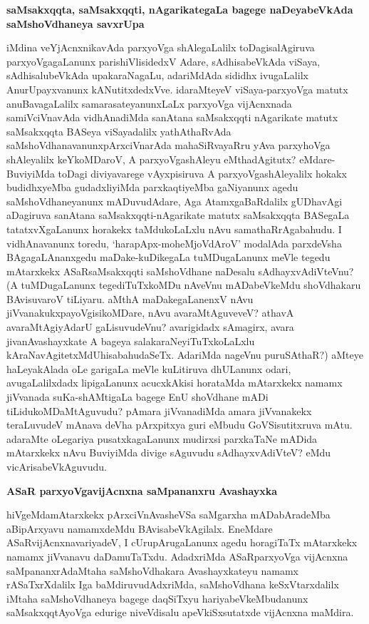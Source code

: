 \textbf{saMsakxqqta, saMsakxqqti, nAgarikategaLa bagege naDeyabeVkAda saMshoVdhaneya savxrUpa}

iMdina veYjAcnxnikavAda parxyoVga shAlegaLalilx toDagisalAgiruva parxyoVgagaLanunx parishiVlisidedxV Adare, sAdhisabeVkAda viSaya, sAdhisalubeVkAda upakaraNagaLu, adariMdAda sididhx ivugaLalilx AnurUpayxvanunx kANutitxdedxVve. idaraMteyeV viSaya-parxyoVga matutx anuBavagaLalilx samarasateyanunxLaLx parxyoVga vijAcnxnada samiVciVnavAda vidhAnadiMda sanAtana saMsakxqqti nAgarikate matutx saMsakxqqta BASeya viSayadalilx yathAthaRvAda saMshoVdhanavanunxpArxciVnarAda mahaSiRvayaRru yAva parxyhoVga shAleyalilx keYkoMDaroV, A parxyoVgashAleyu eMthadAgitutx? eMdare-BuviyiMda toDagi diviyavarege vAyxpisiruva A parxyoVgashAleyalilx hokakx budidhxyeMba gudadxliyiMda parxkaqtiyeMba gaNiyanunx agedu saMshoVdhaneyanunx mADuvudAdare, Aga AtamxgaBaRdalilx gUDhavAgi aDagiruva sanAtana saMsakxqqti-nAgarikate matutx saMsakxqqta BASegaLa tatatxvXgaLanunx horakekx taMdukoLaLxlu nAvu samathaRrAgabahudu. I vidhAnavanunx toredu, `harapApx-moheMjoVdAroV' modalAda parxdeVsha BAgagaLAnanxgedu maDake-kuDikegaLa tuMDugaLanunx meVle tegedu mAtarxkekx ASaRsaMsakxqqti saMshoVdhane naDesalu sAdhayxvAdiVteVnu? (A tuMDugaLanunx tegediTuTxkoMDu nAveVnu mADabeVkeMdu shoVdhakaru BAvisuvaroV tiLiyaru. aMthA maDakegaLanenxV nAvu jiVvanakukxpayoVgisikoMDare, nAvu avaraMtAguveveV? athavA avaraMtAgiyAdarU gaLisuvudeVnu? avarigidadx sAmagirx, avara jivanAvashayxkate A bageya salakaraNeyiTuTxkoLaLxlu kAraNavAgitetxMdUhisabahudaSeTx. AdariMda nageVnu puruSAthaR?) aMteye haLeyakAlada oLe garigaLa meVle kuLitiruva dhULanunx odari, avugaLalilxdadx lipigaLanunx acucxkAkisi horataMda mAtarxkekx namamx jiVvanada suKa-shAMtigaLa bagege EnU shoVdhane mADi tiLidukoMDaMtAguvudu? pAmara jiVvanadiMda amara jiVvanakekx teraLuvudeV mAnava deVha pArxpitxya guri eMbudu GoVSisutitxruva mAtu. adaraMte oLegariya pusatxkagaLanunx mudirxsi parxkaTaNe mADida mAtarxkekx nAvu BuviyiMda divige sAguvudu sAdhayxvAdiVteV? eMdu vicArisabeVkAguvudu.

\textbf{ASaR parxyoVgavijAcnxna saMpananxru Avashayxka}

hiVgeMdamAtarxkekx pArxciVnAvasheVSa saMgarxha mADabAradeMba aBipArxyavu namamxdeMdu BAvisabeVkAgilalx. EneMdare ASaRvijAcnxnavariyadeV, I cUrupArugaLanunx agedu horagiTaTx mAtarxkekx namamx jiVvanavu daDamuTaTxdu. AdadxriMda ASaRparxyoVga vijAcnxna saMpananxrAdaMtaha saMshoVdhakara Avashayxkateyu namamx rASaTxrXdalilx Iga baMdiruvudAdxriMda, saMshoVdhana keSxVtarxdalilx iMtaha saMshoVdhaneya bagege daqSiTxyu hariyabeVkeMbudanunx saMsakxqqtAyoVga edurige niveVdisalu apeVkiSxsutatxde vijAcnxna maMdira.

